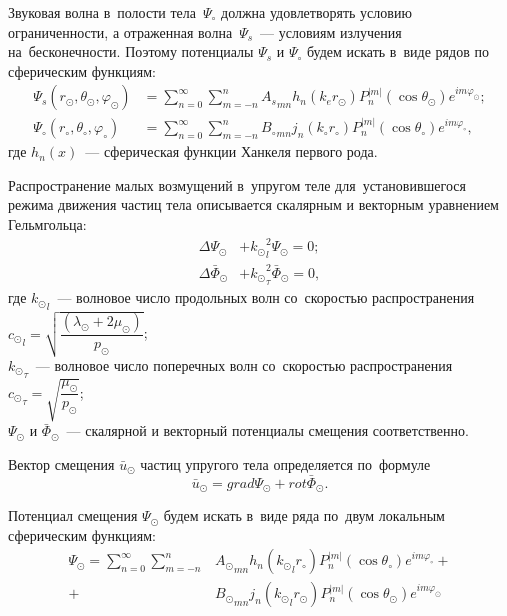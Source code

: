 Звуковая волна в~полости тела~$\Psi_\circ$ должна удовлетворять условию ограниченности, а отраженная волна~$\Psi_s$~--- условиям излучения на~бесконечности. Поэтому потенциалы $\Psi_s$ и $\Psi_\circ$ будем искать в~виде рядов по сферическим функциям:
\begin{align}\Psi_s(r_\odot, \theta_\odot, \varphi_\odot) &= \sum\limits_{n = 0}^\infty \sum\limits_{m = -n}^n {A_s}_{mn} h_n(k_e r_\odot) P_n^{\lvert m\rvert}(\cos\theta_\odot) e^{im\varphi_\odot};\label{eq_psc}\\
\Psi_\circ(r_\circ, \theta_\circ, \varphi_\circ) &= \sum\limits_{n = 0}^\infty \sum\limits_{m = -n}^n {B_\circ}_{mn} j_n(k_\circ r_\circ) P_n^{\lvert m\rvert}(\cos\theta_\circ)e^{im\varphi_\circ},\label{eq_pc}
\end{align}
где $h_n(x)$~--- сферическая функции Ханкеля первого рода.

Распространение малых возмущений в~упругом теле для~установившегося режима движения частиц тела описывается скалярным и векторным уравнением Гельмгольца:
\begin{align}
\Delta\Psi_\odot &+ {k_\odot}_l^2\Psi_\odot = 0;\label{Helmholtz_scalar}\\
\Delta\bar{\Phi}_\odot &+ {k_\odot}_\tau^2\bar{\Phi}_\odot = 0,\label{Helmholtz_vector}
\end{align}
где ${k_\odot}_l$~--- волновое число продольных волн со~скоростью распространения \break 
${c_\odot}_l = \sqrt{\dfrac{(\lambda_\odot + 2\mu_\odot)}{p_\odot}}$;\\
${k_\odot}_\tau$~--- волновое число поперечных волн со~скоростью распространения \\
${c_\odot}_\tau = \sqrt{\dfrac{\mu_\odot}{p_\odot}}$;\\
$\Psi_\odot$ и $\bar{\Phi}_\odot$~--- скалярной и векторный потенциалы смещения соответственно.

Вектор смещения $\bar{u}_\odot$ частиц упругого тела определяется по~формуле
$$
\bar{u}_\odot =  grad \Psi_\odot +  rot \bar{\Phi}_\odot.
$$

Потенциал смещения $\Psi_\odot$ будем искать в~виде ряда по~двум локальным сферическим функциям:
\begin{equation}\label{eq_ps}
\begin{split}
\Psi_\odot = \sum\limits_{n=0}^\infty \sum\limits_{m=-n}^n 
  &{A_\odot}_{mn} h_n({k_\odot}_lr_\circ)P_n^{\lvert m\rvert}(\cos\theta_\circ) e^{im\varphi_\circ} +\\
+ &{B_\odot}_{mn} j_n({k_\odot}_lr_\odot)P_n^{\lvert m\rvert}(\cos\theta_\odot) e^{im\varphi_\odot}
\end{split}
\end{equation}

